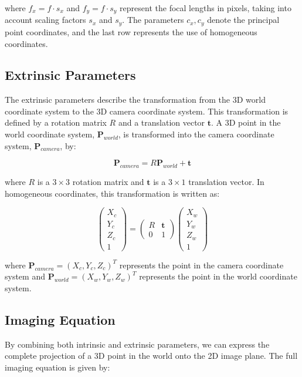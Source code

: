 where $f_x = f \cdot s_x$ and $f_y = f \cdot s_y$ represent the focal lengths in pixels, taking into account scaling factors $s_x$ and $s_y$. The parameters $c_x, c_y$ denote the principal point coordinates, and the last row represents the use of homogeneous coordinates.

\subsection{Extrinsic Parameters}
The extrinsic parameters describe the transformation from the 3D world coordinate system to the 3D camera coordinate system. This transformation is defined by a rotation matrix $R$ and a translation vector $\mathbf{t}$. A 3D point in the world coordinate system, $\mathbf{P}_{world}$, is transformed into the camera coordinate system, $\mathbf{P}_{camera}$, by:

\[
\mathbf{P}_{camera} = R \mathbf{P}_{world} + \mathbf{t}
\]

where $R$ is a $3 \times 3$ rotation matrix and $\mathbf{t}$ is a $3 \times 1$ translation vector. In homogeneous coordinates, this transformation is written as:

\[
\begin{pmatrix}
	X_c \\
	Y_c \\
	Z_c \\
	1
\end{pmatrix}
=
\begin{pmatrix}
	R & \mathbf{t} \\
	0 & 1
\end{pmatrix}
\begin{pmatrix}
	X_w \\
	Y_w \\
	Z_w \\
	1
\end{pmatrix}
\]

where $\mathbf{P}_{camera} = (X_c, Y_c, Z_c)^T$ represents the point in the camera coordinate system and $\mathbf{P}_{world} = (X_w, Y_w, Z_w)^T$ represents the point in the world coordinate system.

\subsection{Imaging Equation}
By combining both intrinsic and extrinsic parameters, we can express the complete projection of a 3D point in the world onto the 2D image plane. The full imaging equation is given by:

